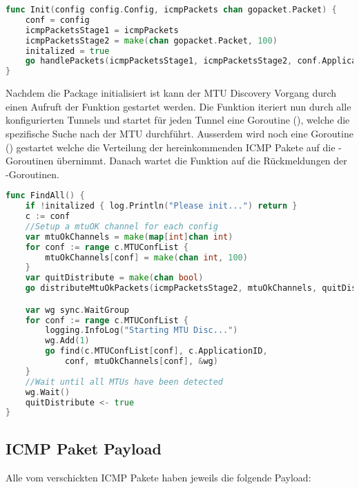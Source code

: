 \begin{lstlisting}[language=go, caption=mtu.Init(..) Funktion]                    
func Init(config config.Config, icmpPackets chan gopacket.Packet) {
	conf = config
	icmpPacketsStage1 = icmpPackets
	icmpPacketsStage2 = make(chan gopacket.Packet, 100)
	initalized = true
	go handlePackets(icmpPacketsStage1, icmpPacketsStage2, conf.ApplicationID)
}
\end{lstlisting}

Nachdem die Package initialisiert ist kann der \ac{MTU} Discovery Vorgang durch einen Aufruft der  Funktion gestartet werden. Die  Funktion iteriert nun durch alle konfigurierten Tunnels und startet für jeden Tunnel eine Goroutine (), welche die spezifische Suche nach der \ac{MTU} durchführt.
Ausserdem wird noch eine Goroutine () gestartet welche die Verteilung der hereinkommenden \ac{ICMP} Pakete auf die -Goroutinen übernimmt.
Danach wartet die  Funktion auf die Rückmeldungen der -Goroutinen.

\begin{lstlisting}[language=go, caption=mtu.Init(..) Funktion]                    
func FindAll() {
	if !initalized { log.Println("Please init...") return }
	c := conf
	//Setup a mtuOK channel for each config
	var mtuOkChannels = make(map[int]chan int)
	for conf := range c.MTUConfList {
		mtuOkChannels[conf] = make(chan int, 100)
	}
	var quitDistribute = make(chan bool)
	go distributeMtuOkPackets(icmpPacketsStage2, mtuOkChannels, quitDistribute)

	var wg sync.WaitGroup
	for conf := range c.MTUConfList {
		logging.InfoLog("Starting MTU Disc...")
		wg.Add(1)
		go find(c.MTUConfList[conf], c.ApplicationID,
			conf, mtuOkChannels[conf], &wg)
	}
	//Wait until all MTUs have been detected
	wg.Wait()
	quitDistribute <- true
}
\end{lstlisting}



\subsection{ICMP Paket Payload}
Alle vom \tool{} verschickten \acs{ICMP} Pakete haben jeweils die folgende Payload:

